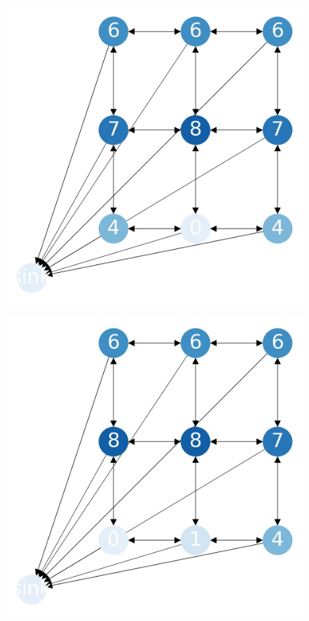 \documentclass{beamer}
\begin{document}
\begin{frame}
  \begin{figure}[h!]
    \centering
      \includegraphics[scale=0.25]{sandpile_4}
  \end{figure}
\end{frame}


\begin{frame}
  \begin{figure}[h!]
    \centering
      \includegraphics[scale=0.25]{sandpile_5}
  \end{figure}
\end{frame}
\end{document}
